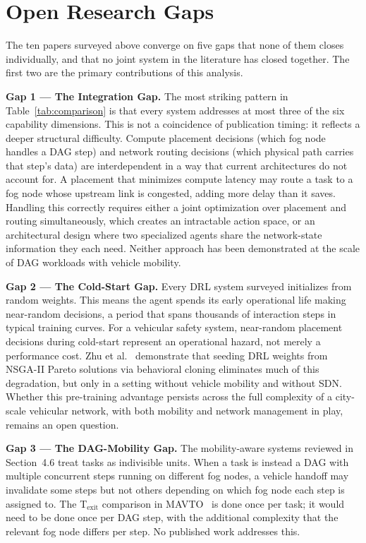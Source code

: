 \documentclass[12pt,a4paper]{article}
\begin{document}
\section{Open Research Gaps}
\label{sec:gaps}

The ten papers surveyed above converge on five gaps that none of them closes
individually, and that no joint system in the literature has closed together. The
first two are the primary contributions of this analysis.

\medskip\noindent\textbf{Gap 1 — The Integration Gap.}
The most striking pattern in Table~\ref{tab:comparison} is that every system
addresses at most three of the six capability dimensions. This is not a coincidence
of publication timing: it reflects a deeper structural difficulty. Compute
placement decisions (which fog node handles a DAG step) and network routing
decisions (which physical path carries that step's data) are interdependent in a
way that current architectures do not account for. A placement that minimizes
compute latency may route a task to a fog node whose upstream link is congested,
adding more delay than it saves. Handling this correctly requires either a joint
optimization over placement and routing simultaneously, which creates an
intractable action space, or an architectural design where two specialized agents
share the network-state information they each need. Neither approach has been
demonstrated at the scale of DAG workloads with vehicle mobility.

\medskip\noindent\textbf{Gap 2 — The Cold-Start Gap.}
Every DRL system surveyed initializes from random weights. This means the agent
spends its early operational life making near-random decisions, a period that spans
thousands of interaction steps in typical training curves. For a vehicular safety
system, near-random placement decisions during cold-start represent an operational
hazard, not merely a performance cost. Zhu et al.~\cite{zhu2025dag} demonstrate
that seeding DRL weights from NSGA-II Pareto solutions via behavioral cloning
eliminates much of this degradation, but only in a setting without vehicle
mobility and without SDN. Whether this pre-training advantage persists across the
full complexity of a city-scale vehicular network, with both mobility and network
management in play, remains an open question.

\medskip\noindent\textbf{Gap 3 — The DAG-Mobility Gap.}
The mobility-aware systems reviewed in Section~4.6 treat tasks as indivisible
units. When a task is instead a DAG with multiple concurrent steps running on
different fog nodes, a vehicle handoff may invalidate some steps but not others
depending on which fog node each step is assigned to. The T$_\text{exit}$
comparison in MAVTO~\cite{mavto2024} is done once per task; it would need to be
done once per DAG step, with the additional complexity that the relevant fog node
differs per step. No published work addresses this.
\end{document}
